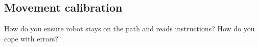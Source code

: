 \subsection{Movement calibration}
How do you ensure robot stays on the path and reads instructions? How do you cope with errors?